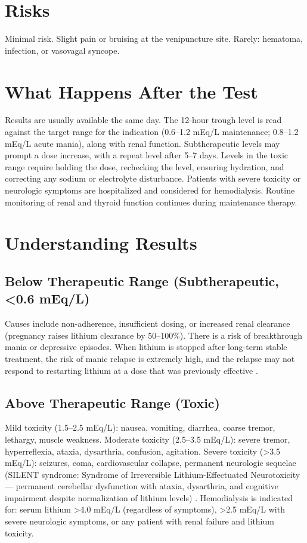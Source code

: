 \section*{Risks}
Minimal risk. Slight pain or bruising at the venipuncture site. Rarely: hematoma, infection, or vasovagal syncope.

\section*{What Happens After the Test}
Results are usually available the same day. The 12-hour trough level is read against the target range for the indication (0.6--1.2 mEq/L maintenance; 0.8--1.2 mEq/L acute mania), along with renal function. Subtherapeutic levels may prompt a dose increase, with a repeat level after 5--7 days. Levels in the toxic range require holding the dose, rechecking the level, ensuring hydration, and correcting any sodium or electrolyte disturbance. Patients with severe toxicity or neurologic symptoms are hospitalized and considered for hemodialysis. Routine monitoring of renal and thyroid function continues during maintenance therapy.

\section*{Understanding Results}

\subsection*{Below Therapeutic Range (Subtherapeutic, <0.6 mEq/L)}
Causes include non-adherence, insufficient dosing, or increased renal clearance (pregnancy raises lithium clearance by 50--100\%). There is a risk of breakthrough mania or depressive episodes. When lithium is stopped after long-term stable treatment, the risk of manic relapse is extremely high, and the relapse may not respond to restarting lithium at a dose that was previously effective \cite{severus2014lithium}.

\subsection*{Above Therapeutic Range (Toxic)}
Mild toxicity (1.5--2.5 mEq/L): nausea, vomiting, diarrhea, coarse tremor, lethargy, muscle weakness. Moderate toxicity (2.5--3.5 mEq/L): severe tremor, hyperreflexia, ataxia, dysarthria, confusion, agitation. Severe toxicity (>3.5 mEq/L): seizures, coma, cardiovascular collapse, permanent neurologic sequelae (SILENT syndrome: Syndrome of Irreversible Lithium-Effectuated Neurotoxicity --- permanent cerebellar dysfunction with ataxia, dysarthria, and cognitive impairment despite normalization of lithium levels) \cite{hansen1978lithium}. Hemodialysis is indicated for: serum lithium >4.0 mEq/L (regardless of symptoms), >2.5 mEq/L with severe neurologic symptoms, or any patient with renal failure and lithium toxicity.


